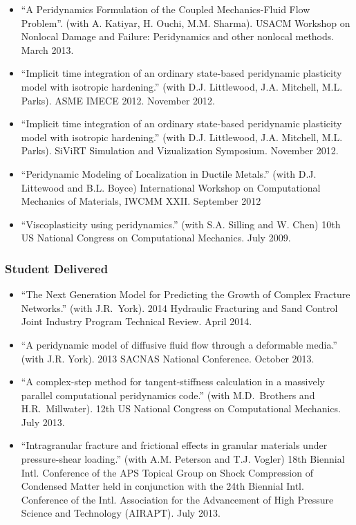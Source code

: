 \begin{itemize}
    \item ``A Peridynamics Formulation of the Coupled Mechanics-Fluid Flow Problem''. (with A. Katiyar, H. Ouchi, M.M. Sharma). USACM Workshop on Nonlocal Damage and Failure: Peridynamics and other nonlocal methods. March 2013.
    \item ``Implicit time integration of an ordinary state-based peridynamic plasticity model with isotropic hardening.'' (with D.J. Littlewood, J.A. Mitchell, M.L. Parks).  ASME IMECE 2012.  November 2012.
    \item ``Implicit time integration of an ordinary state-based peridynamic plasticity model with isotropic hardening.'' (with D.J. Littlewood, J.A. Mitchell, M.L. Parks).  SiViRT Simulation and Vizualization Symposium.  November 2012.
    \item ``Peridynamic Modeling of Localization in Ductile Metals.'' (with D.J. Littewood and B.L. Boyce)  International Workshop on Computational Mechanics of Materials,
IWCMM XXII. September 2012
    \item ``Viscoplasticity using peridynamics.''  (with S.A. Silling and W. Chen) 10th US National Congress on Computational Mechanics. July 2009.
\end{itemize}

\subsubsection*{Student Delivered}

\begin{itemize}

  \item ``The Next Generation Model for Predicting the Growth of Complex Fracture Networks.'' (with J.R.~York). 2014 Hydraulic Fracturing and Sand Control Joint Industry Program Technical Review.  April 2014.
  \item ``A peridynamic model of diffusive fluid flow through a deformable media.'' (with J.R. York). 2013 SACNAS National Conference. October 2013.
  \item ``A complex-step method for tangent-stiffness calculation in a massively parallel computational peridynamics code.'' (with M.D.~Brothers and H.R.~Millwater). 12th US National Congress on Computational Mechanics. July 2013.
  \item ``Intragranular fracture and frictional effects in granular materials under pressure-shear loading.'' (with A.M. Peterson and T.J. Vogler) 18th Biennial Intl. Conference of the APS Topical Group on Shock Compression of Condensed Matter held in conjunction with the 24th Biennial Intl. Conference of the Intl. Association for the Advancement of High Pressure Science and Technology (AIRAPT). July 2013.
\end{itemize}

